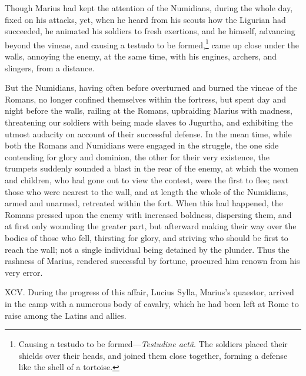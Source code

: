 Though Marius had kept the attention of the Numidians, during the
whole day, fixed on his attacks, yet, when he heard from his scouts
how the Ligurian had succeeded, he animated his soldiers to fresh
exertions, and he himself, advancing beyond the vineae, and causing a
testudo to be formed,\footnote{Causing a testudo to be formed—\emph{Testudine actâ}. The soldiers
placed their shields over their heads, and joined them close together,
forming a defense like the shell of a tortoise.} came up close under the walls, annoying the
enemy, at the same time, with his engines, archers, and slingers, from
a distance.

But the Numidians, having often before overturned and burned the
vineae of the Romans, no longer confined themselves within the
fortress, but spent day and night before the walls, railing at the
Romans, upbraiding Marius with madness, threatening our soldiers with
being made slaves to Jugurtha, and exhibiting the utmost audacity on
account of their successful defense. In the mean time, while both the
Romans and Numidians were engaged in the struggle, the one side
contending for glory and dominion, the other for their very existence,
the trumpets suddenly sounded a blast in the rear of the enemy, at
which the women and children, who had gone out to view the contest,
were the first to flee; next those who were nearest to the wall, and
at length the whole of the Numidians, armed and unarmed, retreated
within the fort. When this had happened, the Romans pressed upon the
enemy with increased boldness, dispersing them, and at first only
wounding the greater part, but afterward making their way over the
bodies of those who fell, thirsting for glory, and striving who should
be first to reach the wall; not a single individual being detained by
the plunder. Thus the rashness of Marius, rendered successful by
fortune, procured him renown from his very error.

XCV. During the progress of this affair, Lucius Sylla, Marius's
quaestor, arrived in the camp with a numerous body of cavalry, which
he had been left at Rome to raise among the Latins and allies.

